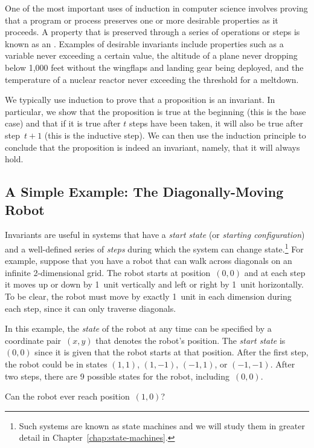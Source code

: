 One of the most important uses of induction in computer science
involves proving that a program or process preserves one or more
desirable properties as it proceeds.  A property that is preserved
through a series of operations or steps is known as an
.  Examples of desirable invariants include properties
such as a variable never exceeding a certain value, the altitude of a
plane never dropping below 1,000 feet without the wingflaps and
landing gear being deployed, and the temperature of a nuclear reactor
never exceeding the threshold for a meltdown.

We typically use induction to prove that a proposition is an
invariant.  In particular, we show that the proposition is true at the
beginning (this is the base case) and that if it is true after $t$
steps have been taken, it will also be true after step~$t + 1$ (this
is the inductive step).  We can then use the induction principle to
conclude that the proposition is indeed an invariant, namely, that it will
always hold.

\subsection{A Simple Example: The Diagonally-Moving Robot}

Invariants are useful in systems that have a \emph{start state} (or
\emph{starting configuration}) and a well-defined series of
\emph{steps} during which
the system can change state.\footnote{Such systems are known as state
  machines and we will study them in greater detail in
  Chapter~\ref{chap:state-machines}.}  For example, suppose that you have a
robot that can walk across diagonals on an infinite 2-dimensional
grid.  The robot starts at position~$(0, 0)$ and at each step it moves
up or down by 1~unit vertically and left or right by 1~unit
horizontally.  To be clear, the robot must move by exactly 1~unit in
each dimension during each step, since it can only traverse diagonals.

In this example, the \emph{state} of the robot at any time can be
specified by a coordinate pair~$(x, y)$ that denotes the robot's
position.  The \emph{start state} is~$(0, 0)$ since it is given that
the robot starts at that position.  After the first step, the robot
could be in states $(1, 1)$, $(1, -1)$, $(-1, 1)$, or $(-1, -1)$.
After two steps, there are 9 possible states for the robot,
including~$(0, 0)$.

Can the robot ever reach position~$(1, 0)$?

